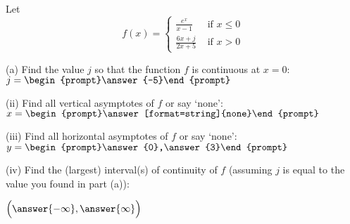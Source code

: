 \documentclass{ximera}
\author{Tom Dinitz and Nela Lakos}
\begin{document}
\begin{exercise}

Let 
\[
f(x)=
\begin{cases}
\frac{e^x}{x-1} & \text{ if } x\leq 0\\
\frac{6x+j}{2x+5} & \text{ if } x>0
\end{cases}
\]

(a) Find the value $j$ so that the function $f$ is continuous at $x=0$: $j=\begin{prompt}\answer{-5}\end{prompt}$

(ii) Find all vertical asymptotes of $f$ or say `none': $x=\begin{prompt}\answer[format=string]{none}\end{prompt}$

(iii) Find all horizontal asymptotes of $f$ or say `none': $y=\begin{prompt}\answer{0},\answer{3}\end{prompt}$

(iv) Find the (largest) interval(s) of continuity of $f$ (assuming $j$ is equal to the value you found in part (a)): 
\begin{prompt}
$\Big(\answer{-\infty},\answer{\infty}\Big)$
\end{prompt}

\end{exercise}
\end{document}
